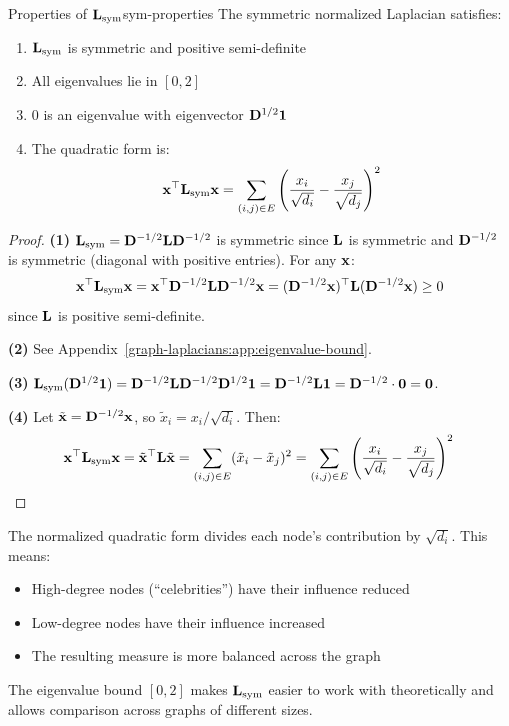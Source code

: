 \begin{notechapter}
\begin{theorem}{Properties of $\mathbf{L}_{\text{sym}}$}{sym-properties}
The symmetric normalized Laplacian satisfies:
\begin{enumerate}
    \item $\mathbf{L}_{\text{sym}}$ is symmetric and positive semi-definite
    \item All eigenvalues lie in $[0, 2]$
    \item $0$ is an eigenvalue with eigenvector $\mathbf{D}^{1/2} \mathbf{1}$
    \item The quadratic form is:
    \begin{equation}
    \mathbf{x}^\top \mathbf{L}_{\text{sym}} \mathbf{x} = \sum_{(i,j) \in E} \left( \frac{x_i}{\sqrt{d_i}} - \frac{x_j}{\sqrt{d_j}} \right)^2
    \end{equation}
\end{enumerate}
\end{theorem}

\begin{proof}
\textbf{(1)} $\mathbf{L}_{\text{sym}} = \mathbf{D}^{-1/2} \mathbf{L} \mathbf{D}^{-1/2}$ is symmetric since $\mathbf{L}$ is symmetric and $\mathbf{D}^{-1/2}$ is symmetric (diagonal with positive entries). For any $\mathbf{x}$:
\[
\mathbf{x}^\top \mathbf{L}_{\text{sym}} \mathbf{x} = \mathbf{x}^\top \mathbf{D}^{-1/2} \mathbf{L} \mathbf{D}^{-1/2} \mathbf{x} = (\mathbf{D}^{-1/2}\mathbf{x})^\top \mathbf{L} (\mathbf{D}^{-1/2}\mathbf{x}) \geq 0
\]
since $\mathbf{L}$ is positive semi-definite.

\textbf{(2)} See Appendix~\ref{graph-laplacians:app:eigenvalue-bound}.

\textbf{(3)} $\mathbf{L}_{\text{sym}} (\mathbf{D}^{1/2}\mathbf{1}) = \mathbf{D}^{-1/2} \mathbf{L} \mathbf{D}^{-1/2} \mathbf{D}^{1/2} \mathbf{1} = \mathbf{D}^{-1/2} \mathbf{L} \mathbf{1} = \mathbf{D}^{-1/2} \cdot \mathbf{0} = \mathbf{0}$.

\textbf{(4)} Let $\tilde{\mathbf{x}} = \mathbf{D}^{-1/2}\mathbf{x}$, so $\tilde{x}_i = x_i / \sqrt{d_i}$. Then:
\[
\mathbf{x}^\top \mathbf{L}_{\text{sym}} \mathbf{x} = \tilde{\mathbf{x}}^\top \mathbf{L} \tilde{\mathbf{x}} = \sum_{(i,j) \in E} (\tilde{x}_i - \tilde{x}_j)^2 = \sum_{(i,j) \in E} \left( \frac{x_i}{\sqrt{d_i}} - \frac{x_j}{\sqrt{d_j}} \right)^2 \qedhere
\]
\end{proof}

\begin{intuition}
The normalized quadratic form divides each node's contribution by $\sqrt{d_i}$. This means:
\begin{itemize}
    \item High-degree nodes (``celebrities'') have their influence reduced
    \item Low-degree nodes have their influence increased
    \item The resulting measure is more balanced across the graph
\end{itemize}
The eigenvalue bound $[0,2]$ makes $\mathbf{L}_{\text{sym}}$ easier to work with theoretically and allows comparison across graphs of different sizes.
\end{intuition}


\end{notechapter}
